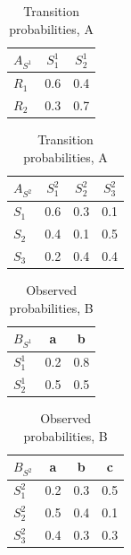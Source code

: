 \documentclass{sig-alternate}
\begin{document}



\begin{table}[h]
\centering
\begin{tabular}{ l | c | c }
 $A_{S^{1}}$ & $S^1_1$ & $S^1_2$ \\
\hline
$R_1$ & 0.6 & 0.4 \\
$R_2$ & 0.3 & 0.7 \\
\end{tabular}
\quad
\begin{tabular}{ l | c | c | c }
  $A_{S^{2}}$ & $S^2_1$ & $S^2_2$ & $S^2_3$ \\
\hline
$S_1$ & 0.6 & 0.3 & 0.1 \\
$S_2$ & 0.4 & 0.1 & 0.5 \\
$S_3$ & 0.2 & 0.4 & 0.4 \\
\end{tabular}
\caption{Transition probabilities, A}
\label{table:A}
\end{table}

\begin{table}[h]
\centering
\begin{tabular}{ l | c | c }
 $B_{S^{1}}$ & a & b \\
\hline
$S^1_1$ & 0.2 & 0.8 \\
$S^1_2$ & 0.5 & 0.5 \\
\end{tabular}
\quad
\begin{tabular}{ l | c | c | c}
 $B_{S^{2}}$ & a & b & c\\
\hline
$S^2_1$ & 0.2 & 0.3 & 0.5 \\
$S^2_2$ & 0.5 & 0.4 & 0.1 \\
$S^2_3$ & 0.4 & 0.3 & 0.3 \\
\end{tabular}
\caption{Observed probabilities, B}
\label{table:B}
\end{table}
\end{document}
